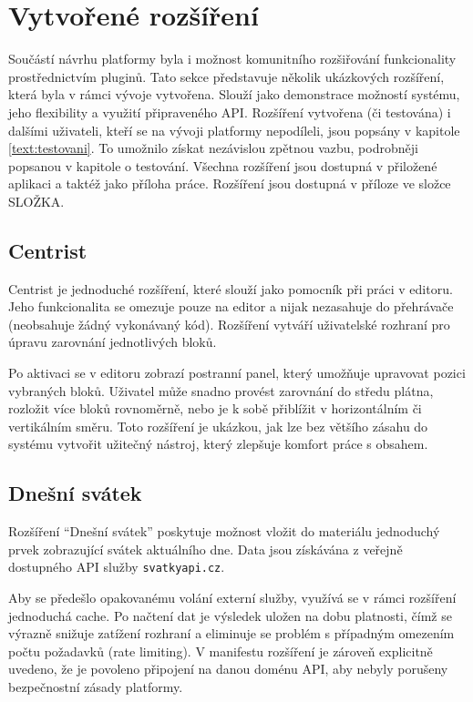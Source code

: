 \section{Vytvořené rozšíření}\label{text:realizace/vytvoreneRozsireni}

Součástí návrhu platformy byla i možnost komunitního rozšiřování funkcionality prostřednictvím pluginů. 
Tato sekce představuje několik ukázkových rozšíření, která byla v rámci vývoje vytvořena. 
Slouží jako demonstrace možností systému, jeho flexibility a využití připraveného API. 
Rozšíření vytvořena (či testována) i dalšími uživateli, kteří se na vývoji platformy nepodíleli, jsou popsány v kapitole \ref{text:testovani}.
To umožnilo získat nezávislou zpětnou vazbu, podrobněji popsanou v kapitole o testování. Všechna rozšíření jsou dostupná v přiložené aplikaci a taktéž jako příloha práce.
Rozšíření jsou dostupná v příloze ve složce SLOŽKA.

\subsection{Centrist}

Centrist je jednoduché rozšíření, které slouží jako pomocník při práci v editoru.
Jeho funkcionalita se omezuje pouze na editor a nijak nezasahuje do přehrávače (neobsahuje žádný vykonávaný kód).
Rozšíření vytváří uživatelské rozhraní pro úpravu zarovnání jednotlivých bloků.

Po aktivaci se v editoru zobrazí postranní panel, který umožňuje upravovat pozici vybraných bloků. 
Uživatel může snadno provést zarovnání do středu plátna, rozložit více bloků rovnoměrně, nebo je k sobě přiblížit v horizontálním či vertikálním směru. 
Toto rozšíření je ukázkou, jak lze bez většího zásahu do systému vytvořit užitečný nástroj, který zlepšuje komfort práce s obsahem.

\subsection{Dnešní svátek}

Rozšíření \enquote{Dnešní svátek} poskytuje možnost vložit do materiálu jednoduchý prvek zobrazující svátek aktuálního dne. 
Data jsou získávána z veřejně dostupného API služby \texttt{svatkyapi.cz}.

Aby se předešlo opakovanému volání externí služby, využívá se v rámci rozšíření jednoduchá cache. 
Po načtení dat je výsledek uložen na dobu platnosti, čímž se výrazně snižuje zatížení rozhraní a eliminuje se problém s případným omezením počtu požadavků (rate limiting).
V manifestu rozšíření je zároveň explicitně uvedeno, že je povoleno připojení na danou doménu API, aby nebyly porušeny bezpečnostní zásady platformy.


